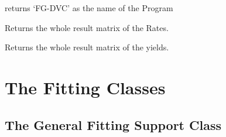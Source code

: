 \documentclass[letterpaper,10pt,english]{sphinxmanual}
\begin{document}
\begin{fulllineitems}
\begin{fulllineitems}
\end{fulllineitems}


\begin{fulllineitems}
\label{FGDVCClasses:Fit_one_run.FGDVC_Result.Name}
returns `FG-DVC' as the name of the Program

\end{fulllineitems}


\begin{fulllineitems}
\label{FGDVCClasses:Fit_one_run.FGDVC_Result.Rates_all}
Returns the whole result matrix of the Rates.

\end{fulllineitems}


\begin{fulllineitems}
\label{FGDVCClasses:Fit_one_run.FGDVC_Result.Yields_all}
Returns the whole result matrix of the yields.

\end{fulllineitems}


\end{fulllineitems}



\chapter{The Fitting Classes}
\label{FittingClasses:the-fitting-classes}\label{FittingClasses::doc}

\section{The General Fitting Support Class}
\label{FittingClasses:the-general-fitting-support-class}
\end{document}
